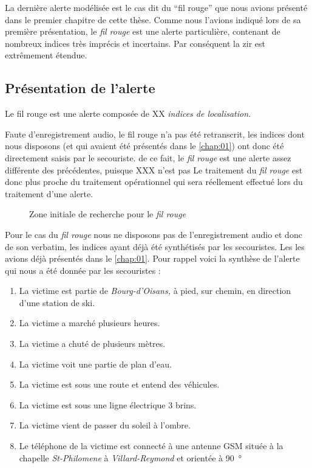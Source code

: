 
La dernière alerte modélisée est le cas dit du \enquote{fil rouge} que
nous avions présenté dans le premier chapitre de cette thèse. Comme
nous l'avions indiqué lors de sa première présentation, le \emph{fil
  rouge} est une alerte particulière, contenant de nombreux indices
très imprécis et incertains. Par conséquent la \ac{zir} est
extrêmement étendue.


\subsection{Présentation de l'alerte}
\label{subsec:9-4-1}

Le fil rouge est une alerte composée de XX \emph{indices de
  localisation.}




Faute d'enregistrement audio, le fil rouge n'a pas été retranscrit,
les indices dont nous disposons (et qui avaient été présentés dans le
\autoref{chap:01}) ont donc été directement saisis par le secouriste.
%
de ce fait, le \emph{fil rouge} est une alerte assez différente des
précédentes, puisque XXX n'est pas
%
Le traitement du \emph{fil rouge} est donc plus proche du traitement
opérationnel qui sera réellement effectué lors du traitement d'une
alerte.



\begin{figure}
  \centering
  
  \caption{Zone initiale de recherche pour le \emph{fil rouge}}
  \label{fig:zir_fil_rouge}
\end{figure}

Pour le cas du \emph{fil rouge} nous ne disposons pas de
l'enregistrement audio et donc de son verbatim, les indices ayant déjà 
été synthétisés par les secouristes. Les les avions déjà présentés
dans le \autoref{chap:01}.
%
Pour rappel voici la synthèse de l'alerte qui nous a été donnée par
les secouristes :
%
\begin{enumerate}
\item La victime est partie de \emph{Bourg-d'Oisans,} à pied, sur
  chemin, en direction d'une station de ski.
\item La victime a marché plusieurs heures.
\item La victime a chuté de plusieurs mètres.
\item La victime voit une partie de plan d'eau.
\item La victime est sous une route et entend des véhicules.
\item La victime est sous une ligne électrique 3 brins.
\item La victime vient de passer du soleil à l'ombre.
\item Le téléphone de la victime est connecté à une antenne GSM située
  à la chapelle \emph{St-Philomene} à \emph{Villard-Reymond} et
  orientée à \SI{90}{\degree}
\end{enumerate}

